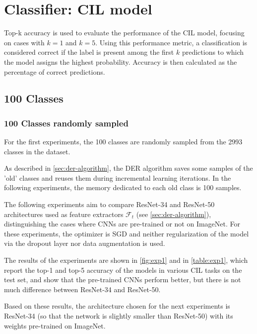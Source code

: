 \section{Classifier: CIL model}
\label{sec:exp-cil}
Top-k accuracy is used to evaluate the performance of the CIL model, focusing on cases with $k=1$ and $k=5$.
Using this performance metric, a classification is considered correct if the label is present among the first $k$ predictions to which the model assigns the highest probability.
Accuracy is then calculated as the percentage of correct predictions.

\subsection{100 Classes}
\subsubsection{100 Classes randomly sampled}
For the first experiments, the 100 classes are randomly sampled from the 2993 classes in the dataset.



As described in \autoref{sec:der-algorithm}, the DER algorithm saves some samples of the 'old' classes and reuses them during incremental learning iterations. In the following experiments, the memory dedicated to each old class is 100 samples.

The following experiments aim to compare ResNet-34 and ResNet-50 architectures used as feature extractors $\mathcal{F}_t$ (see \autoref{sec:der-algorithm}), distinguishing the cases where CNNs are pre-trained or not on ImageNet.
For these experiments, the optimizer is SGD and neither regularization of the model via the dropout layer nor data augmentation is used.

The results of the experiments are shown in \autoref{fig:exp1} and in \autoref{table:exp1}, which report the top-1 and top-5 accuracy of the models in various CIL tasks on the test set, and show that the pre-trained CNNs perform better, but there is not much difference between ResNet-34 and ResNet-50.

Based on these results, the architecture chosen for the next experiments is ResNet-34 (so that the network is slightly smaller than ResNet-50) with its weights pre-trained on ImageNet.

